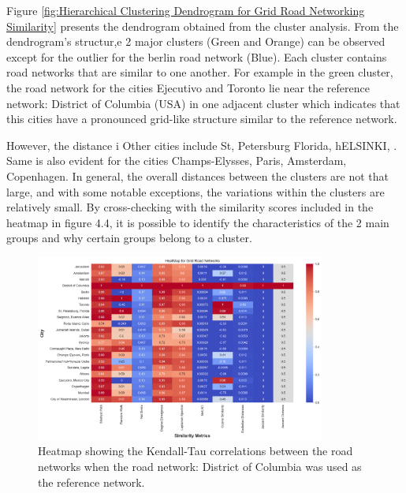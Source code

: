 Figure \ref{fig:Hierarchical Clustering Dendrogram for Grid Road Networking Similarity} presents the dendrogram obtained from the cluster analysis. From the dendrogram's structur,e 2 major clusters (Green and Orange) can be observed except for the outlier for the berlin road network (Blue). Each cluster contains road networks that are similar to one another. For example in the green cluster, the road network for the cities Ejecutivo and Toronto lie near the reference network: District of Columbia (USA) in one adjacent cluster which indicates that this cities have a pronounced grid-like structure similar to the reference network. 

However, the distance i Other cities include St, Petersburg Florida, hELSINKI, . Same is also evident for the cities Champs-Elysses, Paris, Amsterdam, Copenhagen.  In general, the overall distances between the clusters are not that large, and with some notable exceptions, the variations within the clusters are relatively small. By cross-checking with the similarity scores included in the heatmap in figure 4.4, it is possible to identify the characteristics of the 2 main groups and why certain groups belong to a cluster. 

\begin{figure}[!ht]
\centering
\includegraphics[width=0.85\textwidth,center]{picture/Grid/gridheatmap.png}
\caption[Heatmap showing the Kendall-Tau correlations for Grid Road Networks]{Heatmap showing the Kendall-Tau correlations between the road networks when the road network: District of Columbia was used as the reference network.}
\label{fig:Heatmap showing the Kendall-Tau correlations for Grid Road Networks}
\end{figure}

